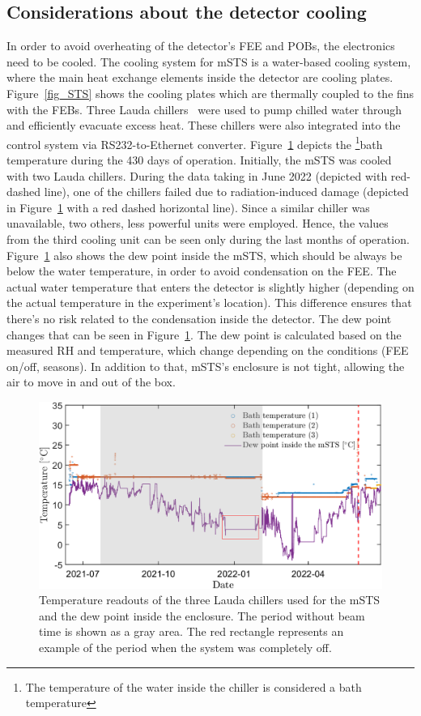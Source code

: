 \subsection{Considerations about the detector cooling}
\label{msts_cooling}
In order to avoid overheating of the detector's \gls{FEE} and \glspl{POB}, the electronics need to be cooled. The cooling system for \gls{mSTS} is a water-based cooling system, where the main heat exchange elements inside the detector are cooling plates.  Figure~\ref{fig_STS} shows the cooling plates which are thermally coupled to the fins with the \glspl{FEB}. Three Lauda chillers~\cite{Lauda1} were used to pump chilled water through and efficiently evacuate excess heat. These chillers were also integrated into the control system via RS232-to-Ethernet converter. Figure~\ref{fig_cooling} depicts the \footnote{The temperature of the water inside the chiller is considered a bath temperature}{bath temperature} during the 430 days of operation. Initially, the \gls{mSTS} was cooled with two Lauda chillers. During the data taking in June 2022 (depicted with red-dashed line), one of the chillers failed due to radiation-induced damage (depicted in Figure~\ref{fig_cooling} with a red dashed horizontal line). Since a similar chiller was unavailable, two others, less powerful units were employed. Hence, the values from the third cooling unit can be seen only during the last months of operation. Figure~\ref{fig_cooling} also shows the dew point inside the \gls{mSTS}, which should be always be below the water temperature, in order to avoid condensation on the \gls{FEE}. The actual water temperature that enters the detector is slightly higher (depending on the actual temperature in the experiment's location). This difference ensures that there's no risk related to the condensation inside the detector. The dew point changes that can be seen in Figure~\ref{fig_cooling}. The dew point is calculated based on the measured \gls{RH} and temperature, which change depending on the conditions (\gls{FEE} on/off, seasons). In addition to that, \gls{mSTS}'s enclosure is not tight, allowing the air to move in and out of the box. 
\begin{figure}[!h]
\centering
\includegraphics[width=0.95\columnwidth]{Chapter6/DCS/images/cooling.png}
\caption{Temperature readouts of the three Lauda chillers used for the \gls{mSTS} and the dew point inside the enclosure. The period without beam time is shown as a gray area. The red rectangle represents an example of the period when the system was completely off.}
\label{fig_cooling}
\end{figure}

